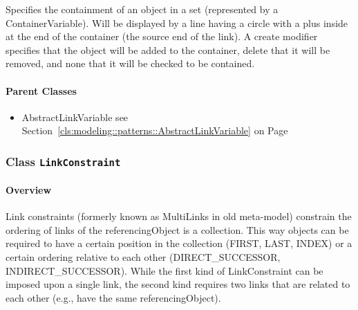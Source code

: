 	
			
Specifies the containment of an object in a set (represented by a ContainerVariable). Will be displayed by a line having a circle with a plus inside at the end of the container (the source end of the link). A create modifier specifies that the object will be added to the container, delete that it will be removed, and none that it will be checked to be contained.	
		
	



\paragraph{Parent Classes}
\begin{itemize}
\item AbstractLinkVariable see Section~\ref{cls:modeling::patterns::AbstractLinkVariable} on Page~\pageref{cls:modeling::patterns::AbstractLinkVariable}\end{itemize}
\subsubsection{\Large{Class \bfseries \texttt{LinkConstraint}\normalfont}}
\label{cls:modeling::patterns::LinkConstraint} 
\paragraph{Overview}

	
			
Link constraints (formerly known as MultiLinks in old meta-model) constrain the ordering of links of the referencingObject is a collection. This way objects can be required to have a certain position in the collection (FIRST, LAST, INDEX) or a certain ordering relative to each other (DIRECT\_SUCCESSOR, INDIRECT\_SUCCESSOR). While the first kind of LinkConstraint can be imposed upon a single link, the second kind requires two links that are related to each other (e.g., have the same referencingObject).	
		
	


